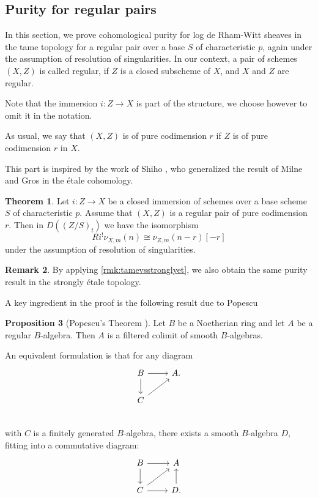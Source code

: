 \documentclass{amsart}
\theoremstyle{definition}
\newtheorem{theorem}{Theorem}[section]
\newtheorem{proposition}[theorem]{Proposition}
\newtheorem{remark}[theorem]{Remark}
\numberwithin{equation}{section}
\begin{document}
\subsection{Purity for regular pairs}
In this section, we prove cohomological purity for log de Rham-Witt sheaves in the tame topology for a regular pair over a base $S$ of characteristic $p$, again under the assumption of resolution of singularities. In our context, a pair of schemes $(X,Z)$ is called regular, if $Z$ is a closed subscheme of $X$, and $X$ and $Z$ are regular. 

 Note that the immersion $i:Z\to X$ is part of the structure, we choose however to omit it  in the notation. 
 
As usual, we say that $(X,Z)$ is of pure codimension $r$ if $Z$ is of pure codimension $r$ in $X$.
 

 This part  is inspired by the work of Shiho \cite{Shiho}, who generalized the result of Milne \cite{MilneValuesOfZeta} and Gros \cite{CohomologyLogGros} in the étale cohomology.
\begin{theorem}\label{regularCase}
	Let $i: Z\to X$ be a closed immersion of  schemes over a base scheme $S$ of characteristic $p$. Assume that $(X,Z)$ is a regular pair of pure codimension $r$. Then  in $D((Z/S)_t)$ we have the isomorphism 
	\[
	Ri^!\nu_{X,m}(n)\cong \nu_{Z,m}(n-r)[-r]
	\]
	under the assumption of resolution of singularities.
\end{theorem}
 \begin{remark}
	By applying \cref{rmk:tamevsstronglyet}, we also obtain the same purity result in the strongly \'etale topology.
 \end{remark}
 A key ingredient in the proof is the following result due to Popescu 
 \begin{proposition}[Popescu's Theorem {\cite[Theorem 07GC]{Stacks}}]\label{PopescuTheorem}
 	Let $B$ be a Noetherian ring and let $A$ be a regular $B$-algebra. Then $A$ is a filtered colimit of smooth $B$-algebras.
 \end{proposition}
 
An equivalent formulation is that for any diagram
 \begin{equation}
 	\begin{tikzcd}
 		B\ar[r]\ar[d]& A.\\
 		C\ar[ur]&\\
 	\end{tikzcd}
 \end{equation} 
with $C$ is a finitely generated $B$-algebra, there exists a smooth $B$-algebra $D$, fitting into a commutative diagram:
 \begin{equation}
 	\begin{tikzcd}
 		B\ar[r]\ar[d]& A\\
 		C\ar[ur]\ar[r]&D.\ar[u]\\
 	\end{tikzcd}
 \end{equation}
 
\end{document}
